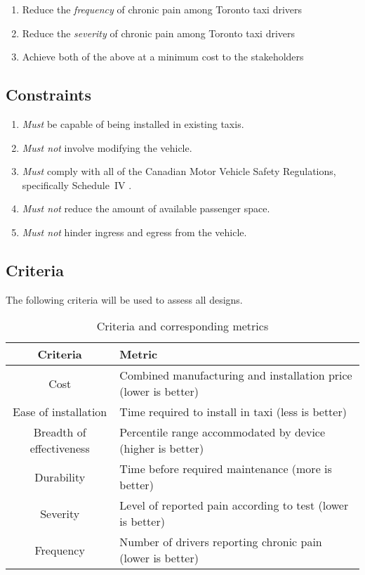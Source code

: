 \documentclass[11pt]{article}
\begin{document}
\begin{enumerate}
\item Reduce the \emph{frequency} of chronic pain among Toronto taxi drivers
\item Reduce the \emph{severity} of chronic pain among Toronto taxi drivers
\item Achieve both of the above at a minimum cost to the stakeholders
\end{enumerate}

\subsection{Constraints}
\begin{enumerate}
\item \emph{Must} be capable of being installed in existing taxis.
\item \emph{Must not} involve modifying the vehicle.
\item \emph{Must} comply with all of the Canadian Motor Vehicle Safety Regulations,
specifically Schedule~IV \cite{motorregs}.
\item \emph{Must not} reduce the amount of available passenger space.
\item \emph{Must not} hinder ingress and egress from the vehicle.
\end{enumerate}
\subsection{Criteria}
The following criteria will be used to assess all designs.
\begin{table}[h]
\centering
\caption{Criteria and corresponding metrics}
\begin{tabular}{c p{10cm} }
  Criteria & Metric \\ \hline
  Cost & Combined manufacturing and installation price (lower is better) \\
  Ease of installation & Time required to install in taxi (less is better) \\
  Breadth of effectiveness & Percentile range accommodated by device (higher is better) \\
  Durability & Time before required maintenance (more is better) \\
  Severity & Level of reported pain according to test (lower is better) \\
  Frequency & Number of drivers reporting chronic pain (lower is better)
\end{tabular}
\end{table}
\end{document}
